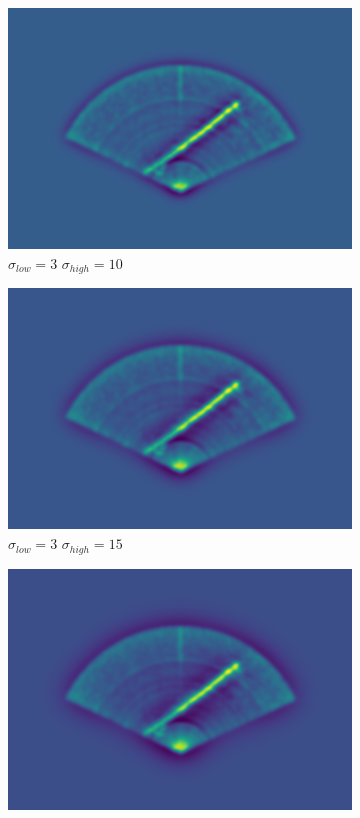 \begin{figure}[H]
\begin{subfigure}[b]{.32\textwidth}
        \includegraphics[width=\textwidth]{figures/bandpassing/3_10.png}
        \caption{\(\sigma_{low} = 3\) \(\sigma_{high} = 10\)}
    \end{subfigure}
    \hfill
    \begin{subfigure}[b]{.32\textwidth}
        \centering
        \includegraphics[width=\textwidth]{figures/bandpassing/3_15.png}
        \caption{\(\sigma_{low} = 3\) \(\sigma_{high} = 15\)}
    \end{subfigure}
    \hfill
    \begin{subfigure}[b]{.32\textwidth}
        \centering
        \includegraphics[width=\textwidth]{figures/bandpassing/3_20.png}

\end{subfigure}
\end{figure}

